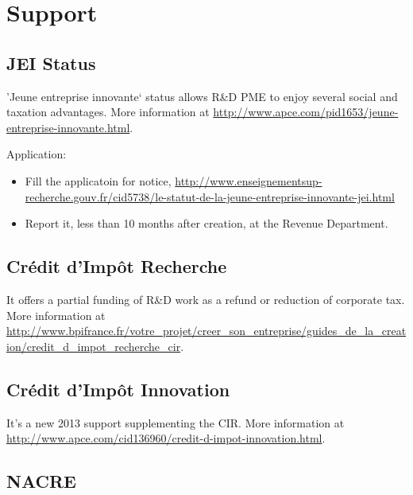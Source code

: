 \section{Support}


\subsection{JEI Status} %

'Jeune entreprise innovante` status allows R\&D PME to enjoy several social and
taxation advantages. More information at \url{http://www.apce.com/pid1653/jeune-entreprise-innovante.html}.

Application:

\begin{itemize}

  \item Fill the applicatoin for notice, \url{http://www.enseignementsup-recherche.gouv.fr/cid5738/le-statut-de-la-jeune-entreprise-innovante-jei.html}
  \item Report it, less than 10 months after creation, at the Revenue Department.\newline

\end{itemize}


\subsection{Crédit d'Impôt Recherche} %

It offers a partial funding of R\&D work as a refund or reduction of corporate tax.
More information at \url{http://www.bpifrance.fr/votre_projet/creer_son_entreprise/guides_de_la_creation/credit_d_impot_recherche_cir}.
\newline


\subsection{Crédit d'Impôt Innovation} %

It's a new 2013 support supplementing the CIR.
More information at \url{http://www.apce.com/cid136960/credit-d-impot-innovation.html}.
\newline


\subsection{NACRE} %


